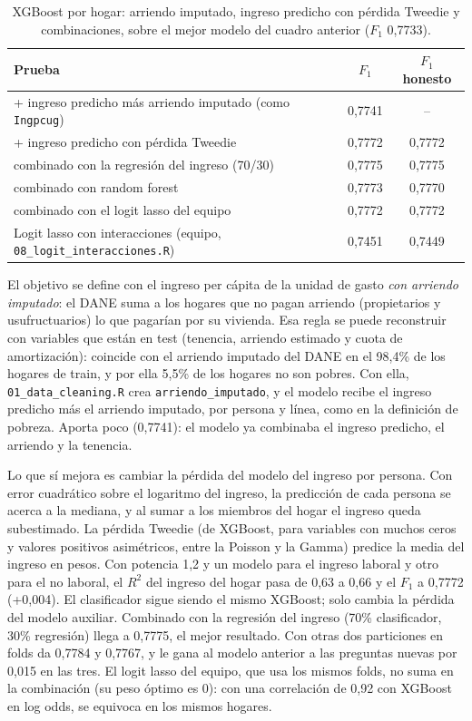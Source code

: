 \documentclass[12pt]{article}
\begin{document}
\begin{table}[H]
  \centering
  \small
  \caption{XGBoost por hogar: arriendo imputado, ingreso predicho con pérdida
    Tweedie y combinaciones, sobre el mejor modelo del cuadro anterior
    ($F_1$ 0,7733).}
  \label{tab:mejoras4}
  \begin{tabular}{@{}p{8.6cm}cc@{}}
    \toprule
    Prueba & $F_1$ & $F_1$ honesto \\
    \midrule
    + ingreso predicho más arriendo imputado (como \texttt{Ingpcug}) & 0,7741 & -- \\
    + ingreso predicho con pérdida Tweedie & 0,7772 & 0,7772 \\
    \quad combinado con la regresión del ingreso (70/30) & 0,7775 & 0,7775 \\
    \quad combinado con random forest & 0,7773 & 0,7770 \\
    \quad combinado con el logit lasso del equipo & 0,7772 & 0,7772 \\
    Logit lasso con interacciones (equipo, \texttt{08\_logit\_interacciones.R}) & 0,7451 & 0,7449 \\
    \bottomrule
  \end{tabular}
\end{table}

El objetivo se define con el ingreso per cápita de la unidad de gasto
\emph{con arriendo imputado}: el DANE suma a los hogares que no pagan arriendo
(propietarios y usufructuarios) lo que pagarían por su vivienda. Esa regla se
puede reconstruir con variables que están en test (tenencia, arriendo
estimado y cuota de amortización): coincide con el arriendo imputado del DANE
en el 98,4\% de los hogares de train, y por ella 5,5\% de los hogares no son
pobres. Con ella, \texttt{01\_data\_cleaning.R} crea \texttt{arriendo\_imputado},
y el modelo recibe el ingreso predicho más el arriendo imputado, por persona y
línea, como en la definición de pobreza. Aporta poco (0,7741): el modelo ya
combinaba el ingreso predicho, el arriendo y la tenencia.

Lo que sí mejora es cambiar la pérdida del modelo del ingreso por persona. Con
error cuadrático sobre el logaritmo del ingreso, la predicción de cada persona
se acerca a la mediana, y al sumar a los miembros del hogar el ingreso queda
subestimado. La pérdida Tweedie (de XGBoost, para variables con muchos ceros y
valores positivos asimétricos, entre la Poisson y la Gamma) predice la media
del ingreso en pesos. Con potencia 1,2 y un modelo para el ingreso laboral y
otro para el no laboral, el $R^2$ del ingreso del hogar pasa de 0,63 a 0,66 y
el $F_1$ a 0,7772 (+0,004). El clasificador sigue siendo el mismo XGBoost;
solo cambia la pérdida del modelo auxiliar. Combinado con la regresión del
ingreso (70\% clasificador, 30\% regresión) llega a 0,7775, el mejor
resultado. Con otras dos particiones en folds da 0,7784 y 0,7767, y le gana al
modelo anterior a las preguntas nuevas por 0,015 en las tres. El logit lasso
del equipo, que usa los mismos folds, no suma en la combinación (su peso
óptimo es 0): con una correlación de 0,92 con XGBoost en log odds, se equivoca
en los mismos hogares.
\end{document}
